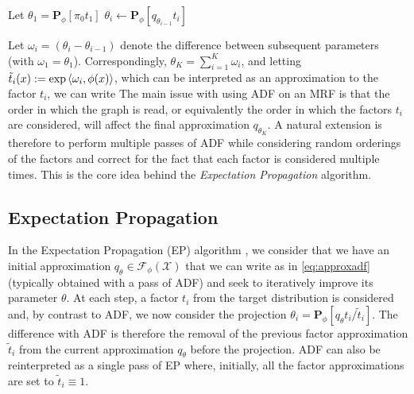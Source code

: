 \begin{algorithm}[!h]\small
	\caption{\label{alg:adf}}
	\begin{algorithmic}[1]
	\State Let $\theta_{1}=\mathbf P_{\phi}[\pi_{0}t_{1}]$
		\State $\theta_{i}\leftarrow\mathbf P_{\phi}[q_{\theta_{i-1}}t_{i}]$ 
	\EndFor\\
	\end{algorithmic}
\end{algorithm} 

Let $\omega_{i}=(\theta_{i}-\theta_{i-1})$ denote the difference between subsequent parameters (with $\omega_{1}=\theta_{1}$). Correspondingly, $\theta_{K}=\sum_{i=1}^{K}\omega_{i}$, and letting $\tilde t_{i}(x):=\exp\left\langle \omega_{i},\phi(x) \right\rangle$, which can be interpreted as an approximation to the factor $t_{i}$, we can write 
%
% 
The main issue with using ADF on an MRF is that the order in which the graph is read, or equivalently the order in which the factors $t_{i}$ are considered, will affect the final approximation $q_{\theta_{K}}$. A natural extension is therefore to perform multiple passes of ADF while considering random orderings of the factors and correct for the fact that each factor is considered multiple times. This is the core idea behind the \emph{Expectation Propagation} algorithm.
%
\subsection{\label{point:EP}Expectation Propagation}
%
In the Expectation Propagation (EP) algorithm \citep{minka01, minka01b, seeger07, gelman14}, we consider that we have an initial approximation $q_{\theta}\in\mathcal F_{\phi}(\mathcal X)$ that we can write as in \eqref{eq:approxadf} (typically obtained with a pass of ADF) and seek to iteratively improve its parameter $\theta$. At each step, a factor $t_{i}$ from the target distribution is considered and, by contrast to ADF, we now consider the projection $\theta_{i}=\mathbf P_{\phi}[q_{\theta}t_{i}/\tilde t_{i}]$. The difference with ADF is therefore the removal of the previous factor approximation $\tilde t_{i}$ from the current approximation $q_{\theta}$ before the projection. ADF can also be reinterpreted as a single pass of EP where, initially, all the factor approximations are set to $\tilde t_{i}\equiv 1$.


